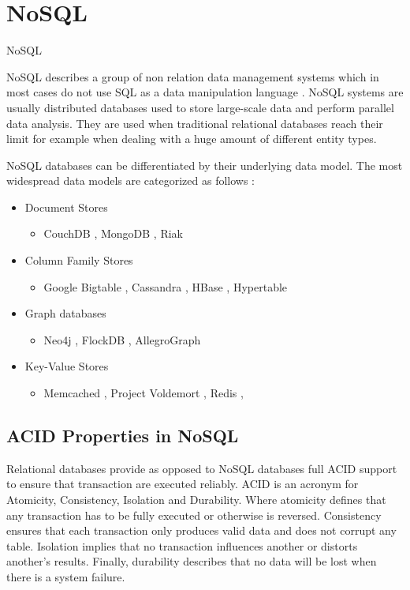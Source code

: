 \section{NoSQL}
\label{sec:nosql}
\acf{NoSQL}

\acf{NoSQL} describes a group of non relation data management systems which in most cases do not use \acf{SQL} as a data manipulation language \cite[1]{moniruzzaman.2013}. \ac{NoSQL} systems are usually distributed databases used to store large-scale data and perform parallel data analysis. They are used when traditional relational databases reach their limit for example when dealing with a huge amount of different entity types. \cite[1 - 2]{moniruzzaman.2013} \cite[23]{orend.2010}

NoSQL databases can be differentiated by their underlying data model. The most widespread data models are categorized as follows \cite[34]{ellis.2010} \cite[2 - 3]{hecht.2011}:

\begin{itemize}
  \item Document Stores
    \begin{itemize}
      \item CouchDB \cite{couch.2014}, MongoDB \cite{mongo.2014}, Riak \cite{riak.2014}
    \end{itemize}
  \item Column Family Stores
    \begin{itemize}
      \item Google Bigtable \cite{chang.2006}, Cassandra \cite{cassandra.2014}, HBase \cite{hbase.2014}, Hypertable \cite{hypertable.2014}
    \end{itemize}
  \item Graph databases
    \begin{itemize}
      \item Neo4j \cite{neo4j.2014}, FlockDB \cite{flock.2010}, AllegroGraph \cite{allegro.2014}
    \end{itemize}
  \item Key-Value Stores
    \begin{itemize}
      \item Memcached \cite{memcached.2014}, Project Voldemort \cite{voldemort.2013}, Redis \cite{redis.2014},
    \end{itemize}
\end{itemize}

\subsection{ACID Properties in NoSQL}
\label{subsec:acid}
Relational databases provide as opposed to \ac{NoSQL} databases full ACID support to ensure that transaction are executed reliably. ACID is an acronym for Atomicity, Consistency, Isolation and Durability. Where atomicity defines that any transaction has to be fully executed or otherwise is reversed. Consistency ensures that each transaction only produces valid data and does not corrupt any table. Isolation implies that no transaction influences another or distorts another's results. Finally, durability describes that no data will be lost when there is a system failure. \cite[71]{pokorny.2011}

